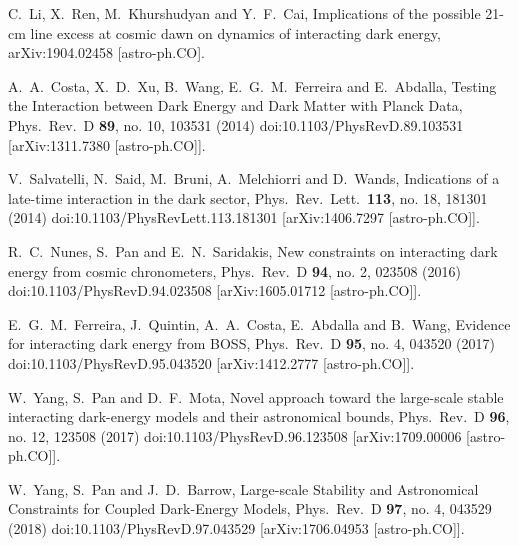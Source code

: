 \documentclass[aps,prd,nofootinbib,amsmath,amssymb,superscriptaddress,twocolumn,10pt]{revtex4}%
\begin{document}
\begin{thebibliography}{99}
  C.~Li, X.~Ren, M.~Khurshudyan and Y.~F.~Cai,
  Implications of the possible 21-cm line excess at cosmic dawn on dynamics of interacting dark energy,
  arXiv:1904.02458 [astro-ph.CO].

  A.~A.~Costa, X.~D.~Xu, B.~Wang, E.~G.~M.~Ferreira and E.~Abdalla,
  Testing the Interaction between Dark Energy and Dark Matter with Planck Data,
  Phys.\ Rev.\ D {\bf 89}, no. 10, 103531 (2014)
  doi:10.1103/PhysRevD.89.103531
  [arXiv:1311.7380 [astro-ph.CO]].

  V.~Salvatelli, N.~Said, M.~Bruni, A.~Melchiorri and D.~Wands,
  Indications of a late-time interaction in the dark sector,
  Phys.\ Rev.\ Lett.\  {\bf 113}, no. 18, 181301 (2014)
  doi:10.1103/PhysRevLett.113.181301
  [arXiv:1406.7297 [astro-ph.CO]].

  R.~C.~Nunes, S.~Pan and E.~N.~Saridakis,
  New constraints on interacting dark energy from cosmic chronometers,
  Phys.\ Rev.\ D {\bf 94}, no. 2, 023508 (2016)
  doi:10.1103/PhysRevD.94.023508
  [arXiv:1605.01712 [astro-ph.CO]].

  E.~G.~M.~Ferreira, J.~Quintin, A.~A.~Costa, E.~Abdalla and B.~Wang,
  Evidence for interacting dark energy from BOSS,
  Phys.\ Rev.\ D {\bf 95}, no. 4, 043520 (2017)
  doi:10.1103/PhysRevD.95.043520
  [arXiv:1412.2777 [astro-ph.CO]].

  W.~Yang, S.~Pan and D.~F.~Mota,
  Novel approach toward the large-scale stable interacting dark-energy models and their astronomical bounds,
  Phys.\ Rev.\ D {\bf 96}, no. 12, 123508 (2017)
  doi:10.1103/PhysRevD.96.123508
  [arXiv:1709.00006 [astro-ph.CO]].

  W.~Yang, S.~Pan and J.~D.~Barrow,
  Large-scale Stability and Astronomical Constraints for Coupled Dark-Energy Models,
  Phys.\ Rev.\ D {\bf 97}, no. 4, 043529 (2018)
  doi:10.1103/PhysRevD.97.043529
  [arXiv:1706.04953 [astro-ph.CO]].


\end{thebibliography}
\end{document}
